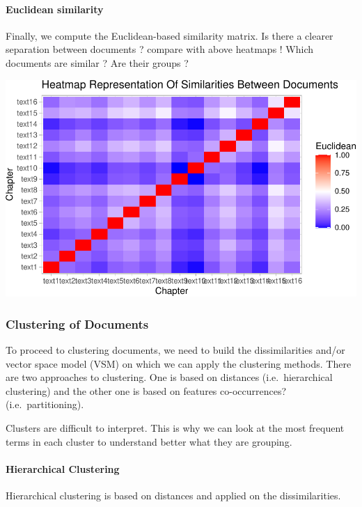 \documentclass[
]{article}
\begin{document}
\hypertarget{euclidean-similarity}{%
\paragraph{Euclidean similarity}\label{euclidean-similarity}}

Finally, we compute the Euclidean-based similarity matrix. Is there a
clearer separation between documents ? compare with above heatmaps !
Which documents are similar ? Are their groups ?

\begin{center}\includegraphics[width=0.7\linewidth]{report_files/figure-latex/Euclidean-1} \end{center}

\hypertarget{clustering-of-documents}{%
\subsubsection{Clustering of Documents}\label{clustering-of-documents}}

To proceed to clustering documents, we need to build the dissimilarities
and/or vector space model (VSM) on which we can apply the clustering
methods. There are two approaches to clustering. One is based on
distances (i.e.~hierarchical clustering) and the other one is based on
features co-occurrences? (i.e.~partitioning).

Clusters are difficult to interpret. This is why we can look at the most
frequent terms in each cluster to understand better what they are
grouping.

\hypertarget{hierarchical-clustering}{%
\paragraph{Hierarchical Clustering}\label{hierarchical-clustering}}

Hierarchical clustering is based on distances and applied on the
dissimilarities.
\end{document}
